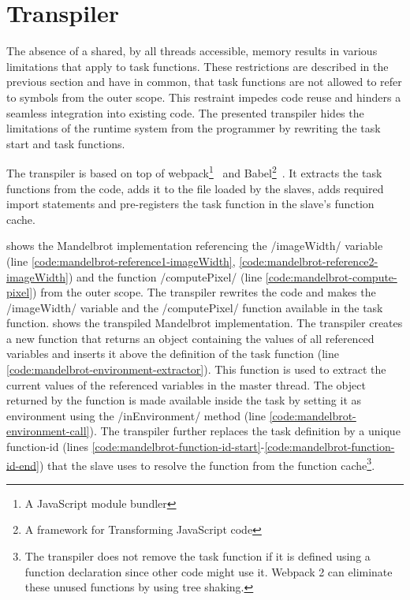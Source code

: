 \section{Transpiler}\label{sec:transpiler}
The absence of a shared, by all threads accessible, memory results in various limitations that apply to task functions. These restrictions are described in the previous section and have in common, that task functions are not allowed to refer to symbols from the outer scope. This restraint impedes code reuse and hinders a seamless integration into existing code. The presented transpiler hides the limitations of the runtime system from the programmer by rewriting the task start and task functions.

The transpiler is based on top of webpack\footnote{A JavaScript module bundler}~\cite{webpack} and Babel\footnote{A framework for Transforming JavaScript code}~\cite{babel}. It extracts the task functions from the code, adds it to the file loaded by the slaves, adds required import statements and pre-registers the task function in the slave's function cache. 

 shows the Mandelbrot implementation referencing the \javascriptinline/imageWidth/ variable (line \ref{code:mandelbrot-reference1-imageWidth}, \ref{code:mandelbrot-reference2-imageWidth}) and the function \javascriptinline/computePixel/ (line \ref{code:mandelbrot-compute-pixel}) from the outer scope. The transpiler rewrites the code and makes the \javascriptinline/imageWidth/ variable and the \javascriptinline/computePixel/ function available in the task function.  shows the transpiled Mandelbrot implementation. The transpiler creates a new function that returns an object containing the values of all referenced variables and inserts it above the definition of the task function (line \ref{code:mandelbrot-environment-extractor}). This function is used to extract the current values of the referenced variables in the master thread. The object returned by the function is made available inside the task by setting it as environment using the \javascriptinline/inEnvironment/ method (line \ref{code:mandelbrot-environment-call}). The transpiler further replaces the task definition by a unique function-id (lines \ref{code:mandelbrot-function-id-start}-\ref{code:mandelbrot-function-id-end}) that the slave uses to resolve the function from the function cache\footnote{ The transpiler does not remove the task function if it is defined using a function declaration since other code might use it. Webpack 2 can eliminate these unused functions by using tree shaking.}. 


